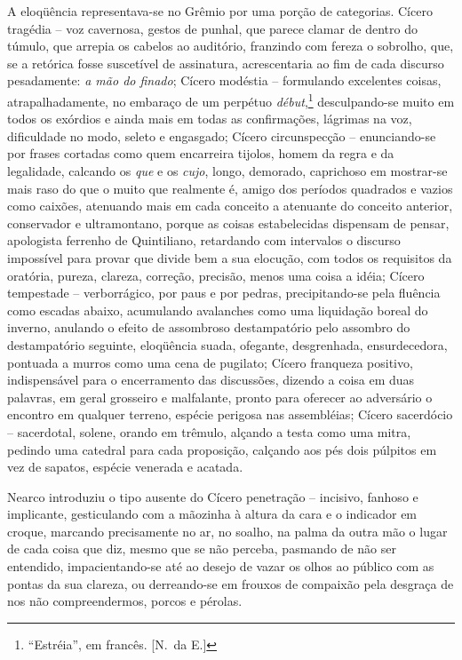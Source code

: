A eloqüência representava{}-se no Grêmio por uma
porção de categorias. Cícero tragédia -- voz cavernosa, gestos de
punhal, que parece clamar de dentro do túmulo, que arrepia os cabelos
ao auditório, franzindo com fereza o sobrolho, que, se a retórica fosse
suscetível de assinatura, acrescentaria ao fim de cada discurso
pesadamente: \textit{a mão do finado}; Cícero modéstia -- formulando excelentes
coisas, atrapalhadamente, no embaraço de um perpétuo \textit{début},\footnote{ ``Estréia'', 
em francês. [N.~da E.]} desculpando{}-se muito em todos os exórdios e ainda mais em todas as
confirmações, lágrimas na voz, dificuldade no modo, seleto e engasgado;
Cícero circunspecção -- enunciando{}-se por frases cortadas como quem
encarreira tijolos, homem da regra e da legalidade, calcando os \textit{que} e
os \textit{cujo}, longo, demorado, caprichoso em mostrar{}-se mais raso do que o
muito que realmente é, amigo dos períodos quadrados e vazios como
caixões, atenuando mais em cada conceito a atenuante do conceito
anterior, conservador e ultramontano, porque as coisas estabelecidas
dispensam de pensar, apologista ferrenho de Quintiliano, retardando com
intervalos o discurso impossível para provar que divide bem a sua
elocução, com todos os requisitos da oratória, pureza, clareza,
correção, precisão, menos uma coisa a idéia; Cícero tempestade -- 
verborrágico, por paus e por pedras, precipitando{}-se pela fluência
como escadas abaixo, acumulando avalanches como uma liquidação boreal
do inverno, anulando o efeito de assombroso destampatório pelo assombro
do destampatório seguinte, eloqüência suada, ofegante, desgrenhada,
ensurdecedora, pontuada a murros como uma cena de pugilato; Cícero
franqueza positivo, indispensável para o encerramento das discussões,
dizendo a coisa em duas palavras, em geral grosseiro e malfalante,
pronto para oferecer ao adversário o encontro em qualquer terreno,
espécie perigosa nas assembléias; Cícero sacerdócio -- sacerdotal,
solene, orando em trêmulo, alçando a testa como uma mitra, pedindo uma
catedral para cada proposição, calçando aos pés dois púlpitos em vez de
sapatos, espécie venerada e acatada. 

Nearco introduziu o tipo ausente
do Cícero penetração -- incisivo, fanhoso e implicante, gesticulando
com a mãozinha à altura da cara e o indicador em croque, marcando
precisamente no ar, no soalho, na palma da outra mão o lugar de cada
coisa que diz, mesmo que se não perceba, pasmando de não ser entendido,
impacientando{}-se até ao desejo de vazar os olhos ao público com as
pontas da sua clareza, ou derreando{}-se em frouxos de compaixão pela
desgraça de nos não compreendermos, porcos e pérolas. 


